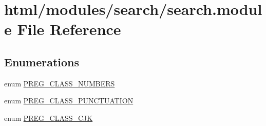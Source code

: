 \hypertarget{search_8module}{
\section{html/modules/search/search.module File Reference}
\label{search_8module}
}
\subsection*{Enumerations}
\begin{DoxyCompactItemize}
\item 
enum \hyperlink{search_8module_af45ac30323578ac282a5fc1927d96305}{PREG\_\-CLASS\_\-NUMBERS} 
\item 
enum \hyperlink{search_8module_ad6f3e596c60aa0865b379d88905a6ed5}{PREG\_\-CLASS\_\-PUNCTUATION} 
\item 
enum \hyperlink{search_8module_a44dc2b3df8c066a2d2ce47f25218f126}{PREG\_\-CLASS\_\-CJK} 
\end{DoxyCompactItemize}
